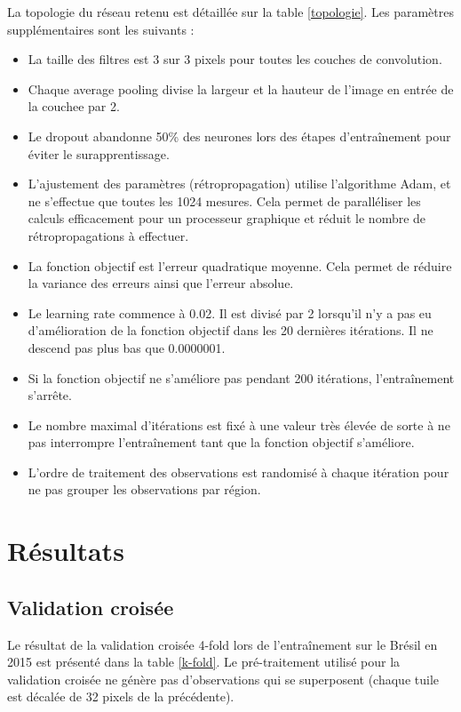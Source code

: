 \documentclass[a4paper, 11pt]{report}
\begin{document}
La topologie du réseau retenu est détaillée sur la table \ref{topologie}.
Les paramètres supplémentaires sont les suivants :
\begin{itemize}
	\item La taille des filtres est 3 sur 3 pixels pour toutes les couches de convolution.
	\item Chaque average pooling divise la largeur et la hauteur de l'image en entrée de la couchee par 2.
	\item Le dropout abandonne 50\% des neurones lors des étapes d'entraînement pour éviter le surapprentissage.
	\item L'ajustement des paramètres (rétropropagation) utilise l'algorithme Adam, et ne s'effectue que toutes les 1024 mesures. Cela permet de paralléliser les calculs efficacement pour un processeur graphique et réduit le nombre de rétropropagations à effectuer.
	\item La fonction objectif est l'erreur quadratique moyenne. Cela permet de réduire la variance des erreurs ainsi que l'erreur absolue.
	\item Le learning rate commence à 0.02. Il est divisé par 2 lorsqu'il n'y a pas eu d'amélioration de la fonction objectif dans les 20 dernières itérations. Il ne descend pas plus bas que 0.0000001.
	\item Si la fonction objectif ne s'améliore pas pendant 200 itérations, l'entraînement s'arrête.
	\item Le nombre maximal d'itérations est fixé à une valeur très élevée de sorte à ne pas interrompre l'entraînement tant que la fonction objectif s'améliore.
	\item L'ordre de traitement des observations est randomisé à chaque itération pour ne pas grouper les observations par région.
\end{itemize}

\section{Résultats}
\subsection{Validation croisée}
Le résultat de la validation croisée 4-fold lors de l'entraînement sur le Brésil en 2015 est présenté dans la table \ref{k-fold}. Le pré-traitement utilisé pour la validation croisée ne génère pas d'observations qui se superposent (chaque tuile est décalée de 32 pixels de la précédente).
\end{document}
